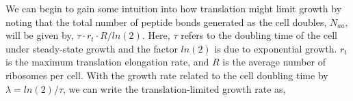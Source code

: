 %

We can begin to gain some intuition into how translation might limit growth by
noting that the total number of peptide bonds generated as the cell doubles,
$N_{aa}$, will be given by, $\tau \cdot
r_t \cdot R / ln(2)$. Here, $\tau$ refers to the doubling time of the cell under
steady-state growth and the factor $ln(2)$ is due to exponential growth. $r_t$ is the maximum translation elongation rate, and $R$ is the average number of ribosomes per cell. With the growth rate related to the
cell doubling time by $\lambda = ln(2)/\tau$, we can write the
translation-limited growth rate as,

